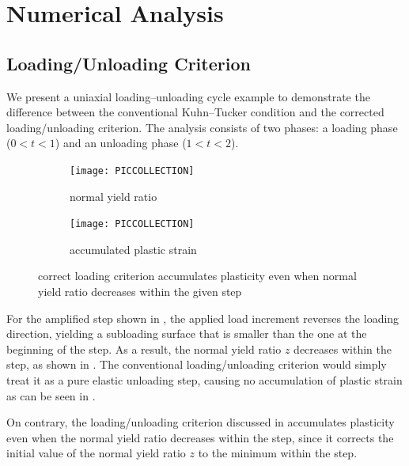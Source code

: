 \section{Numerical Analysis}
\subsection{Loading/Unloading Criterion}
We present a uniaxial loading--unloading cycle  example to demonstrate the difference between the conventional Kuhn--Tucker condition and the corrected loading/unloading criterion.
The analysis consists of two phases: a loading phase ($0<t<1$) and an unloading phase ($1<t<2$).

\begin{figure}[H]
\centering
\begin{subfigure}{.48\textwidth}
\centering
\texttt{[image: PICCOLLECTION]}
\caption{normal yield ratio}\label{fig:compare_loading_criterion_z}
\end{subfigure}\hfill
\begin{subfigure}{.48\textwidth}
    \centering
    \texttt{[image: PICCOLLECTION]}
    \caption{accumulated plastic strain}\label{fig:compare_loading_criterion_q}
\end{subfigure}
\caption{correct loading criterion accumulates plasticity even when normal yield ratio decreases within the given step}\label{fig:compare_loading_criterion}
\end{figure}
For the amplified step shown in , the applied load increment reverses the loading direction, yielding a subloading surface that is smaller than the one at the beginning of the step.
As a result, the normal yield ratio $z$ decreases within the step, as shown in .
The conventional loading/unloading criterion would simply treat it as a pure elastic unloading step, causing no accumulation of plastic strain as can be seen in .

On contrary, the loading/unloading criterion discussed in  accumulates plasticity even when the normal yield ratio decreases within the step, since it corrects the initial value of the normal yield ratio $z$ to the minimum within the step.
